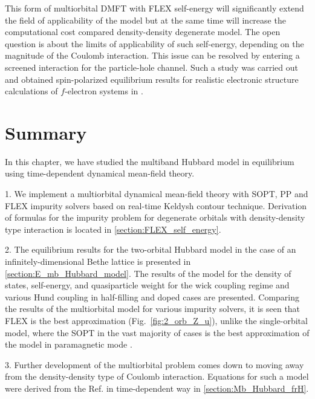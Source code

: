 This form of multiorbital DMFT with FLEX self-energy will significantly extend the field of applicability of the model but at the same time will increase the computational cost compared density-density degenerate model. 
The open question is about the limits of applicability of such self-energy, depending on the magnitude of the Coulomb interaction. 
This issue can be resolved by entering a screened interaction for the particle-hole channel. 
Such a study was carried out and obtained spin-polarized equilibrium results for realistic electronic structure calculations of $f$-electron systems in \citep{PhysRevB.72.115106}.

\FloatBarrier
\section{Summary}
In this chapter, we have studied the multiband Hubbard model in equilibrium using time-dependent dynamical mean-field theory.

1. We implement a multiorbital dynamical mean-field theory with SOPT, PP and FLEX impurity solvers based on real-time Keldysh contour technique. 
Derivation of formulas for the impurity problem for degenerate orbitals with density-density type interaction is located in \autoref{section:FLEX_self_energy}. 

2. The equilibrium results for the two-orbital Hubbard model in the case of an infinitely-dimensional Bethe lattice is presented in \autoref{section:E_mb_Hubbard_model}. The results of the model for the density of states, self-energy, and quasiparticle weight for the wick coupling regime and various Hund coupling in half-filling and doped cases are presented. Comparing the results of the multiorbital model for various impurity solvers, it is seen that FLEX is the best approximation (Fig.~\ref{fig:2_orb_Z_u}), unlike the single-orbital model, where the SOPT in the vast majority of cases is the best approximation of the model in paramagnetic mode \citep{PhysRevB.91.235114}.

3. Further development of the multiorbital problem comes down to moving away from the density-density type of Coulomb interaction. Equations for such a model were derived from the Ref. \citep{PhysRevB.57.6884} in time-dependent way in \autoref{section:Mb_Hubbard_frH}.














